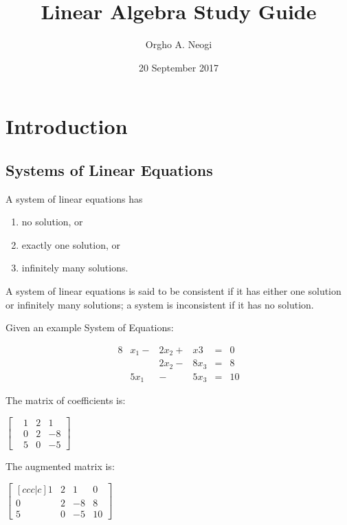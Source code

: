 \documentclass[oneside]{report}
\title{Linear Algebra Study Guide}
\author{Orgho A. Neogi}
\date{20 September 2017}
\begin{document}
\maketitle

\chapter{Introduction}


\section{Systems of Linear Equations}

A system of linear equations has

\begin{enumerate}
  \item no solution, or
  \item exactly one solution, or
  \item infinitely many solutions.
\end{enumerate}

A system of linear equations is said to be consistent if it has either one solution or
infinitely many solutions; a system is inconsistent if it has no solution.

Given an example System of Equations:

\begin{alignat}{8}
  &x_1 - &2x_2 + &x3  &= &0 \\
  &     &2x_2 - &8x_3 &= &8 \\
  &5x_1 &     - &5x_3 &= &10
\end{alignat}

The matrix of coefficients is:

\begin{center}
$\begin{bmatrix}
  &1 &2 &1\\
  &0 &2 &-8\\
  &5 &0 &-5
\end{bmatrix}$
\end{center}

The augmented matrix is:
\begin{center}
  $\begin{bmatrix}[ccc|c]
    1 &2 &1  &0\\
    0 &2 &-8 &8\\
    5 &0 &-5 &10
  \end{bmatrix}$
\end{center}
\end{document}

